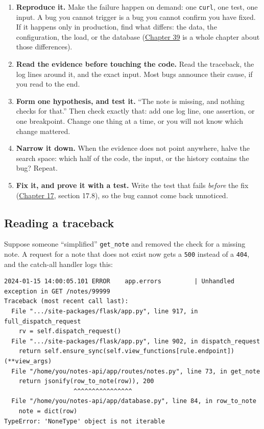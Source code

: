 \begin{enumerate}
\def\labelenumi{\arabic{enumi}.}
\tightlist
\item
  \textbf{Reproduce it.} Make the failure happen on demand: one \texttt{curl}, one test, one input. A bug you cannot trigger is a bug you cannot confirm you have fixed. If it happens only in production, find what differs: the data, the configuration, the load, or the database (\hyperref[ch:39-local-vs-production]{Chapter 39} is a whole chapter about those differences).
\item
  \textbf{Read the evidence before touching the code.} Read the traceback, the log lines around it, and the exact input. Most bugs announce their cause, if you read to the end.
\item
  \textbf{Form one hypothesis, and test it.} ``The note is missing, and nothing checks for that.'' Then check exactly that: add one log line, one assertion, or one breakpoint. Change one thing at a time, or you will not know which change mattered.
\item
  \textbf{Narrow it down.} When the evidence does not point anywhere, halve the search space: which half of the code, the input, or the history contains the bug? Repeat.
\item
  \textbf{Fix it, and prove it with a test.} Write the test that fails \emph{before} the fix (\hyperref[ch:17-build-process]{Chapter 17}, section 17.8), so the bug cannot come back unnoticed.
\end{enumerate}

\subsection*{Reading a traceback}\label{16-logging-error-handling:reading-a-traceback}

Suppose someone ``simplified'' \texttt{get\_note} and removed the check for a missing note. A request for a note that does not exist now gets a \texttt{500} instead of a \texttt{404}, and the catch-all handler logs this:

\begin{outputbox}[short]
\begin{Verbatim}[fontsize=\codesize, breaklines, breakanywhere, breaksymbolleft={\tiny\textcolor{muted}{$\hookrightarrow$}}]
2024-01-15 14:00:05.101 ERROR    app.errors         | Unhandled exception in GET /notes/99999
Traceback (most recent call last):
  File ".../site-packages/flask/app.py", line 917, in full_dispatch_request
    rv = self.dispatch_request()
  File ".../site-packages/flask/app.py", line 902, in dispatch_request
    return self.ensure_sync(self.view_functions[rule.endpoint])(**view_args)
  File "/home/you/notes-api/app/routes/notes.py", line 73, in get_note
    return jsonify(row_to_note(row)), 200
                   ^^^^^^^^^^^^^^^^
  File "/home/you/notes-api/app/database.py", line 84, in row_to_note
    note = dict(row)
TypeError: 'NoneType' object is not iterable
\end{Verbatim}
\end{outputbox}

